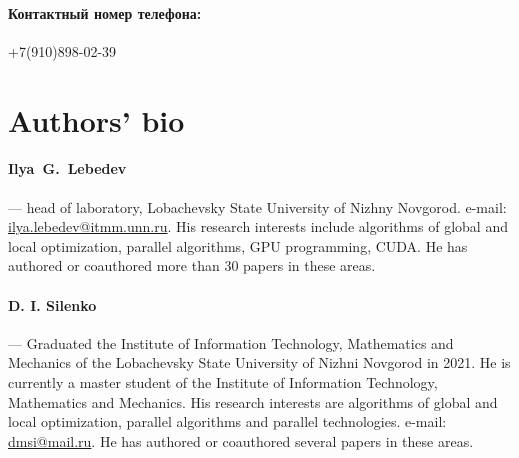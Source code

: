 \documentclass[12pt, a4paper, russian]{article}
\begin{document}
\paragraph{Контактный номер телефона:}{+7(910)898-02-39}

\section*{Authors' bio}

\paragraph{Ilya~G.~Lebedev} --- head of laboratory, Lobachevsky State University of Nizhny Novgorod. e-mail: \url{ilya.lebedev@itmm.unn.ru}. His research interests include algorithms of global and local optimization, parallel algorithms, GPU programming, CUDA. He has authored or coauthored more than 30 papers in these areas.

\paragraph{D. I. Silenko} --- Graduated the Institute of Information Technology, Mathematics and Mechanics of the Lobachevsky State University of Nizhni Novgorod in 2021. He is currently a master student of the Institute of Information Technology, Mathematics and Mechanics. His research interests are algorithms of global and local optimization, parallel algorithms and parallel technologies. e-mail: \url{dmsi@mail.ru}. He has authored or coauthored several papers in these areas.
\end{document}
